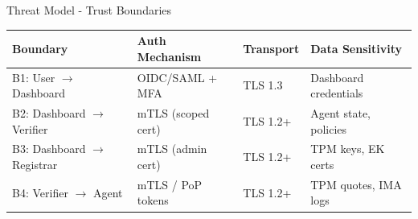 \begin{frame}{Threat Model - Trust Boundaries}
  \vspace{0.1cm}

  \scriptsize
  \begin{center}
    \begin{tabular}{|l|l|l|l|}
      \hline
      \textbf{Boundary} & \textbf{Auth Mechanism} & \textbf{Transport} & \textbf{Data Sensitivity} \\
      \hline
      B1: User $\rightarrow$ Dashboard & OIDC/SAML + MFA & TLS 1.3 & Dashboard credentials \\
      \hline
      B2: Dashboard $\rightarrow$ Verifier & mTLS (scoped cert) & TLS 1.2+ & Agent state, policies \\
      \hline
      B3: Dashboard $\rightarrow$ Registrar & mTLS (admin cert) & TLS 1.2+ & TPM keys, EK certs \\
      \hline
      B4: Verifier $\rightarrow$ Agent & mTLS / PoP tokens & TLS 1.2+ & TPM quotes, IMA logs \\
      \hline
    \end{tabular}
  \end{center}
\end{frame}

